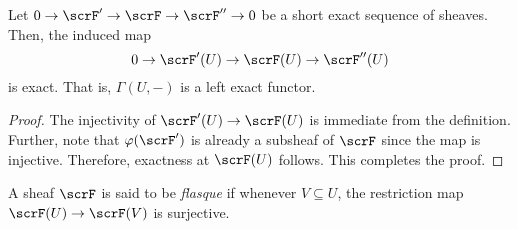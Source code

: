 \begin{proposition}
    Let $0\rightarrow\scrF'\rightarrow\scrF\rightarrow\scrF''\rightarrow 0$ be a short exact sequence of sheaves. Then, the induced map 
    \begin{equation*}
        0\rightarrow\scrF'(U)\rightarrow\scrF(U)\rightarrow\scrF''(U)
    \end{equation*}
    is exact. That is, $\Gamma(U, -)$ is a left exact functor.
\end{proposition}
\begin{proof}
    The injectivity of $\scrF'(U)\to\scrF(U)$ is immediate from the definition. Further, note that $\varphi(\scrF')$ is already a subsheaf of $\scrF$ since the map is injective. Therefore, exactness at $\scrF(U)$ follows. This completes the proof.
\end{proof}

\begin{definition}
    A sheaf $\scrF$ is said to be \emph{flasque} if whenever $V\subseteq U$, the restriction map $\scrF(U)\to\scrF(V)$ is surjective.
\end{definition}

